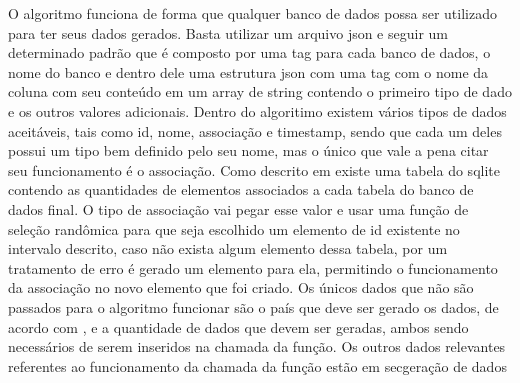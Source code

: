 \documentclass[
	12pt,				%
	openright,			%
	oneside,			%
	a4paper,			%
	english,			%
	french,				%
	spanish,			%
	brazil,				%
	]{abntex2}
\begin{document}
O algoritmo funciona de forma que qualquer banco de dados possa ser utilizado para ter seus dados gerados. Basta utilizar um arquivo json e seguir um determinado padrão que é composto por uma tag para cada banco de dados, o nome do banco e dentro dele uma estrutura json com uma tag com o nome da coluna com seu conteúdo em um array de string contendo o primeiro tipo de dado e os outros valores adicionais.\newline
Dentro do algoritimo existem vários tipos de dados aceitáveis, tais como id, nome, associação e timestamp, sendo que cada um deles possui um tipo bem definido pelo seu nome, mas o único que vale a pena citar seu funcionamento é o associação. Como descrito em  existe uma tabela do sqlite contendo as quantidades de elementos associados a cada tabela do banco de dados final. O tipo de associação vai pegar esse valor e usar uma função de seleção randômica para que seja escolhido um elemento de id existente no intervalo descrito, caso não exista algum elemento dessa tabela, por um tratamento de erro é gerado um elemento para ela, permitindo o funcionamento da associação no novo elemento que foi criado.\newline
Os únicos dados que não são passados para o algoritmo funcionar são o país que deve ser gerado os dados, de acordo com , e a quantidade de dados que devem ser geradas, ambos sendo necessários de serem inseridos na chamada da função.
Os outros dados relevantes referentes ao funcionamento da chamada da função estão em {sec}{geração de dados}
\end{document}

